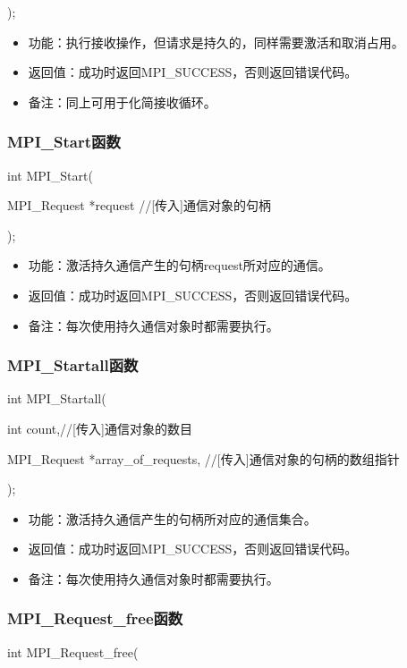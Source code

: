 \documentclass[UTF8]{article}%
\begin{document}
);

\begin{itemize}
    \item 功能：执行接收操作，但请求是持久的，同样需要激活和取消占用。
    \item 返回值：成功时返回MPI\_SUCCESS，否则返回错误代码。
    \item 备注：同上可用于化简接收循环。
\end{itemize}

\subsubsection{MPI\_Start函数}

int MPI\_Start(

    \qquad MPI\_Request *request //[传入]通信对象的句柄

);

\begin{itemize}
    \item 功能：激活持久通信产生的句柄request所对应的通信。
    \item 返回值：成功时返回MPI\_SUCCESS，否则返回错误代码。
    \item 备注：每次使用持久通信对象时都需要执行。
\end{itemize}

\subsubsection{MPI\_Startall函数}

int MPI\_Startall(

    \qquad int          count,//[传入]通信对象的数目

    \qquad MPI\_Request *array\_of\_requests, //[传入]通信对象的句柄的数组指针

);

\begin{itemize}
    \item 功能：激活持久通信产生的句柄所对应的通信集合。
    \item 返回值：成功时返回MPI\_SUCCESS，否则返回错误代码。
    \item 备注：每次使用持久通信对象时都需要执行。
\end{itemize}

\subsubsection{MPI\_Request\_free函数}

int MPI\_Request\_free(
\end{document}
